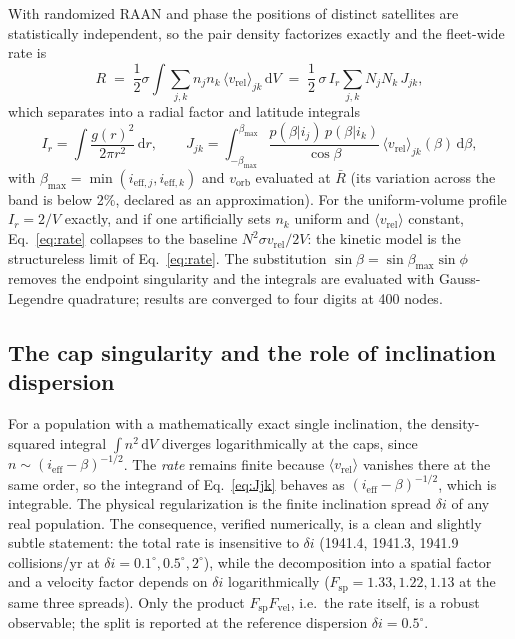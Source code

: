 \documentclass[11pt,a4paper]{article}
\newcommand{\vrel}{v_{\mathrm{rel}}}
\newcommand{\vorb}{v_{\mathrm{orb}}}
\newcommand{\Rbar}{\bar{R}}
\newcommand{\ieff}{i_{\mathrm{eff}}}
\begin{document}
With randomized RAAN and phase the positions of distinct satellites are statistically
independent, so the pair density factorizes exactly and the fleet-wide rate is
\begin{equation}
R \;=\; \frac{1}{2}\sigma \int \sum_{j,k} n_j n_k \,\langle\vrel\rangle_{jk}\,\mathrm{d}V
\;=\; \frac{1}{2}\,\sigma\, I_r \sum_{j,k} N_j N_k\, J_{jk},
\label{eq:rate}
\end{equation}
which separates into a radial factor and latitude integrals
\begin{equation}
I_r = \int \frac{g(r)^2}{2\pi r^2}\,\mathrm{d}r, \qquad
J_{jk} = \int_{-\beta_{\max}}^{\beta_{\max}}
\frac{p(\beta|i_j)\, p(\beta|i_k)}{\cos\beta}\,
\langle\vrel\rangle_{jk}(\beta)\,\mathrm{d}\beta ,
\label{eq:Jjk}
\end{equation}
with $\beta_{\max} = \min(i_{\mathrm{eff},j}, i_{\mathrm{eff},k})$ and $\vorb$ evaluated at $\Rbar$ (its
variation across the band is below 2\%, declared as an approximation). For the
uniform-volume profile $I_r = 2/V$ exactly, and if one artificially sets
$n_k$ uniform and $\langle\vrel\rangle$ constant, Eq.~\eqref{eq:rate} collapses to
the baseline $N^2 \sigma \vrel/2V$: the kinetic model is the structureless limit of
Eq.~\eqref{eq:rate}. The substitution $\sin\beta = \sin\beta_{\max}\sin\phi$ removes
the endpoint singularity and the integrals are evaluated with Gauss-Legendre
quadrature; results are converged to four digits at 400 nodes.

\subsection{The cap singularity and the role of inclination dispersion}
\label{sec:dispersion}

For a population with a mathematically exact single inclination, the density-squared
integral $\int n^2\,\mathrm{d}V$ diverges logarithmically at the caps, since
$n \sim (\ieff - \beta)^{-1/2}$. The \emph{rate} remains finite because
$\langle\vrel\rangle$ vanishes there at the same order, so the integrand of
Eq.~\eqref{eq:Jjk} behaves as $(\ieff-\beta)^{-1/2}$, which is integrable. The
physical regularization is the finite inclination spread $\delta i$ of any real
population. The consequence, verified numerically, is a clean and slightly subtle
statement:
the total rate is insensitive to $\delta i$ (1941.4, 1941.3, 1941.9 collisions/yr at
$\delta i = 0.1^\circ, 0.5^\circ, 2^\circ$), while the decomposition into a spatial
factor and a velocity factor depends on $\delta i$ logarithmically
($F_{\mathrm{sp}} = 1.33, 1.22, 1.13$ at the same three spreads). Only the product
$F_{\mathrm{sp}} F_{\mathrm{vel}}$, i.e.\ the rate itself, is a robust observable; the
split is reported at the reference dispersion $\delta i = 0.5^\circ$.
\end{document}
